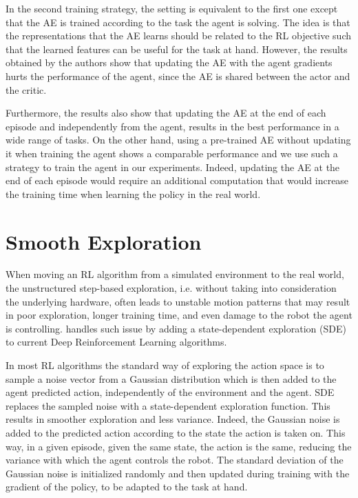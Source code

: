 In the second training strategy, the setting is equivalent to the first one except that the AE is trained according to the task the agent is solving. The idea is that the representations that the AE learns should be related to the RL objective such that the learned features can be useful for the task at hand. However, the results obtained by the authors show that updating the AE with the agent gradients hurts the performance of the agent, since the AE is shared between the actor and the critic.

Furthermore, the results also show that updating the AE at the end of each episode and independently from the agent, results in the best performance in a wide range of tasks. On the other hand, using a pre-trained AE without updating it when training the agent shows a comparable performance and we use such a strategy to train the agent in our experiments. Indeed, updating the AE at the end of each episode would require an additional computation that would increase the training time when learning the policy in the real world.

\section{Smooth Exploration}
When moving an RL algorithm from a simulated environment to the real world, the unstructured step-based exploration, i.e. without taking into consideration the underlying hardware, often leads to unstable motion patterns that may result in poor exploration, longer training time, and even damage to the robot the agent is controlling. \citet{pmlr-v164-raffin22a} handles such issue by adding a state-dependent exploration (SDE) to current Deep Reinforcement Learning algorithms. 

In most RL algorithms the standard way of exploring the action space is to sample a noise vector from a Gaussian distribution which is then added to the agent predicted action, independently of the environment and the agent. SDE replaces the sampled noise with a state-dependent exploration function. This results in smoother exploration and less variance. Indeed, the Gaussian noise is added to the predicted action according to the state the action is taken on. This way, in a given episode, given the same state, the action is the same, reducing the variance with which the agent controls the robot. The standard deviation of the Gaussian noise is initialized randomly and then updated during training with the gradient of the policy, to be adapted to the task at hand.


